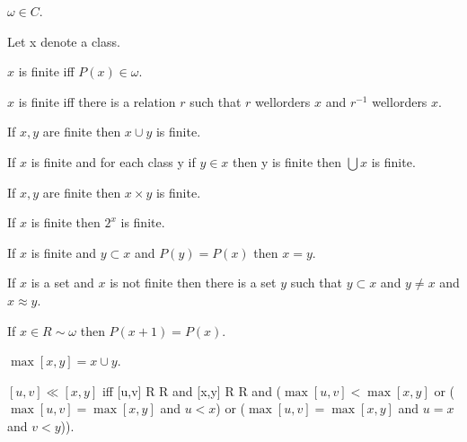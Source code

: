 \documentclass[a4paper,draft]{amsproc}
\begin{document}
\begin{forthel}
\begin{theorem}[165]
$\omega \in C$.
\end{theorem}

Let x denote a class.
\begin{definition}[166]
$x$ is finite iff $P(x) \in \omega$.
\end{definition}

\begin{theorem}[167]
$x$ is finite iff there is a relation $r$ such that $r$ wellorders $x$ and $r^{-1}$ wellorders $x$.
\end{theorem}

\begin{theorem}[168]
If $x, y$ are finite then $x \cup y$ is finite.
\end{theorem}

\begin{theorem}[169]
If $x$ is finite and for each class y if $y \in x$ then y is finite then $\bigcup x$ is finite.
\end{theorem}

\begin{theorem}[170]
If $x, y$ are finite then $x \times y$ is finite.
\end{theorem}

\begin{theorem}[171]
If $x$ is finite then $2^{x}$ is finite.
\end{theorem}

\begin{theorem}[172]
If $x$ is finite and $y \subset x$ and $P(y) = P(x)$ then $x = y$.
\end{theorem}

\begin{theorem}[173]
If $x$ is a set and $x$ is not finite then there is a set $y$ such that $y \subset x$ and $y \neq x$ and $x \approx y$.
\end{theorem}

\begin{theorem}[174]
If $x \in R \sim \omega$ then $P(x + 1) = P(x)$.
\end{theorem}

\begin{definition}[175]
$\max[x,y] = x \cup y$.
\end{definition}

\begin{definition}
$[u,v] \ll [x,y]$ iff [u,v] \in R \times R and [x,y] \in R \times R and 
($\max[u,v] < \max[x,y]$ or ($\max[u,v] = \max[x,y]$ and $u < x$)
	or ($\max[u,v] = \max[x,y]$ and $u = x$ and $v < y$)).
\end{definition}


\end{forthel}
\end{document}
